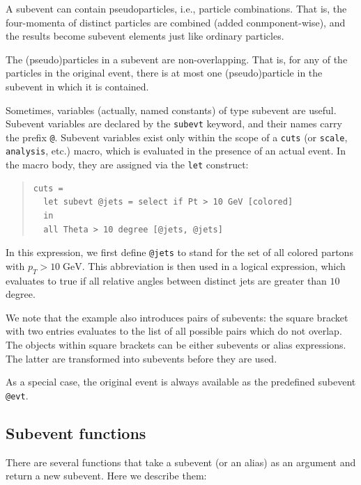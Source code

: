 \documentclass[12pt]{book}
\begin{document}
A subevent can contain pseudoparticles, i.e., particle combinations.
That is, the four-momenta of
distinct particles are combined (added conmponent-wise), and the results
become subevent elements just like ordinary particles.

The (pseudo)particles in a subevent are non-overlapping.  That is, for
any of the particles in the original event, there is at most one
(pseudo)particle in the subevent in which it is contained.

Sometimes, variables (actually, named constants) of type subevent are useful.
Subevent variables are declared by the \texttt{subevt} keyword, and their
names carry the prefix \verb|@|.  Subevent variables exist only within the
scope of a \verb|cuts| (or \verb|scale|, \verb|analysis|, etc.) macro, which
is evaluated in the presence of an actual event.  In the macro body, they are
assigned via the \texttt{let} construct:
\begin{quote}
\begin{footnotesize}
\begin{verbatim}
cuts =
  let subevt @jets = select if Pt > 10 GeV [colored]
  in
  all Theta > 10 degree [@jets, @jets]
\end{verbatim}
\end{footnotesize}
\end{quote}
In this expression, we first define \verb|@jets| to stand for the set of all
colored partons with $p_T>10\;\mathrm{GeV}$.  This abbreviation is then used
in a logical expression, which evaluates to true if all relative angles
between distinct jets are greater than $10$ degree.

We note that the example also introduces pairs of subevents: the square
bracket with two entries evaluates to the list of all possible pairs which do
not overlap.  The objects within square brackets can be either subevents or
alias expressions.  The latter are transformed into subevents before they are
used.

As a special case, the original event is always available as the predefined
subevent \verb|@evt|.

\subsection{Subevent functions}

There are several functions that take a subevent (or an alias) as an argument
and return a new subevent.  Here we describe them:
\end{document}
